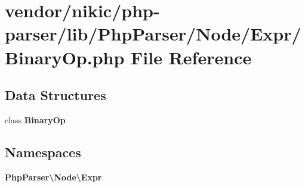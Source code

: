 \section{vendor/nikic/php-\/parser/lib/\+Php\+Parser/\+Node/\+Expr/\+Binary\+Op.php File Reference}
\label{_binary_op_8php}
\subsection*{Data Structures}
\begin{DoxyCompactItemize}
\item 
class {\bf Binary\+Op}
\end{DoxyCompactItemize}
\subsection*{Namespaces}
\begin{DoxyCompactItemize}
\item 
 {\bf Php\+Parser\textbackslash{}\+Node\textbackslash{}\+Expr}
\end{DoxyCompactItemize}
